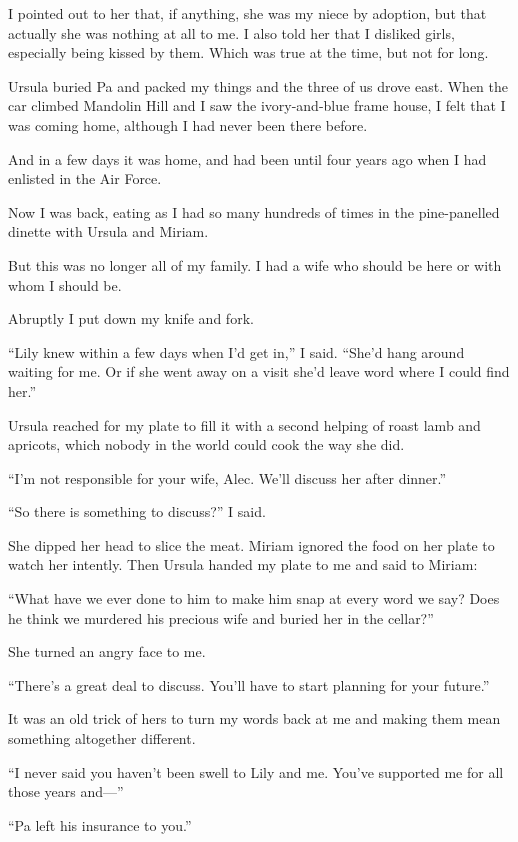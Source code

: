 \documentclass{novel}
\begin{document}
I pointed out to her that, if anything, she was my niece by adoption, but that actually she was nothing at all to me. I also told her that I disliked girls, especially being kissed by them. Which was true at the time, but not for long.

Ursula buried Pa and packed my things and the three of us drove east. When the car climbed Mandolin Hill and I saw the ivory-and-blue frame house, I felt that I was coming home, although I had never been there before.

And in a few days it was home, and had been until four years ago when I had enlisted in the Air Force.

\scenestars

Now I was back, eating as I had so many hundreds of times in the pine-panelled dinette with Ursula and Miriam. 

But this was no longer all of my family. I had a wife who should be here or with whom I should be.

Abruptly I put down my knife and fork.

“Lily knew within a few days when I’d get in,” I said. “She’d hang around waiting for me. Or if she went away on a visit she’d leave word where I could find her.”

Ursula reached for my plate to fill it with a second helping of roast lamb and apricots, which nobody in the world could cook the way she did. 

“I’m not responsible for your wife, Alec. We’ll discuss her after dinner.”

“So there is something to discuss?” I said.

She dipped her head to slice the meat. Miriam ignored the food on her plate to watch her intently. Then Ursula handed my plate to me and said to Miriam:

“What have we ever done to him to make him snap at every word we say? Does he think we murdered his precious wife and buried her in the cellar?”

She turned an angry face to me.

“There’s a great deal to discuss. You’ll have to start planning for your future.”

It was an old trick of hers to turn my words back at me and making them mean something altogether different. 

“I never said you haven’t been swell to Lily and me. You’ve supported me for all those years and—”

“Pa left his insurance to you.”
\end{document}
